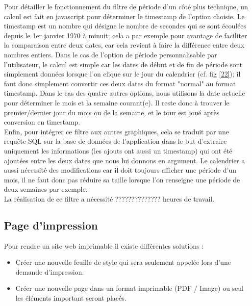 \documentclass[12pt]{report}
\begin{document}
\begin{enumerate}
Pour détailler le fonctionnement du filtre de période d'un côté plus technique, un calcul est fait en javascript pour déterminer le timestamp de l'option choisie. Le timestamp est un nombre qui désigne le nombre de secondes qui se sont écoulées depuis le 1er janvier 1970 à minuit; cela a par exemple pour avantage de faciliter la comparaison entre deux dates, car cela revient à faire la différence entre deux nombres entiers. Dans le cas de l'option de période personnalisable par l'utilisateur, le calcul est simple car les dates de début et de fin de période sont simplement données lorsque l'on clique sur le jour du calendrier (cf. fig \ref{22}); il faut donc simplement convertir ces deux dates du format "normal" au format timestamp. Dans le cas des quatre autres options, nous utilisons la date actuelle pour déterminer le mois et la semaine courant(e). Il reste donc à trouver le premier/dernier jour du mois ou de la semaine, et le tour est joué après conversion en timestamp.\\

Enfin, pour intégrer ce filtre aux autres graphiques, cela se traduit par une requête SQL sur la base de données de l'application dans le but d'extraire uniquement les informations (les ajouts ont aussi un timestamp) qui ont été ajoutées entre les deux dates que nous lui donnons en argument. Le calendrier a aussi nécessité des modifications car il doit toujours afficher une période d'un mois, il ne faut donc pas réduire sa taille lorsque l'on renseigne une période de deux semaines par exemple.\\


La réalisation de ce filtre a nécessité ?????????????? heures de travail.

\subsection{Page d'impression}

Pour rendre un site web imprimable il existe différentes solutions :\\

\begin{itemize}
\item	Créer une nouvelle feuille de style qui sera seulement appelée lors d’une demande d’impression.
\item Créer une nouvelle page dans un format imprimable (PDF / Image) ou seul les éléments important seront placés.
\end{itemize}


\end{enumerate}
\end{document}
